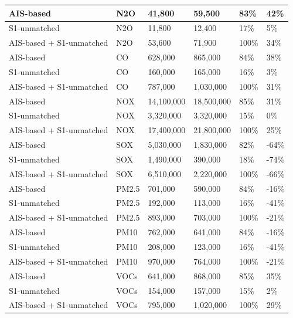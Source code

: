 \documentclass[lineno,pdflatex,sn-nature]{sn-jnl}
\providecommand{\DIFaddbegin}{} %
\providecommand{\DIFaddend}{} %
\providecommand{\DIFaddendFL}{} %
\providecommand{\DIFaddincludegraphics}[2][]{{\color{blue}\fbox{\DIFOincludegraphics[#1]{#2}}}} %
\DeclareRobustCommand{\DIFaddbegin}{\DIFOaddbegin \let\includegraphics\DIFaddincludegraphics} %
\DeclareRobustCommand{\DIFaddend}{\DIFOaddend \let\includegraphics\DIFOincludegraphics} %
\DeclareRobustCommand{\DIFaddendFL}{\DIFOaddendFL \let\includegraphics\DIFOincludegraphics} %
\begin{document}
\begin{table}[!h]
\begin{tabular}[t]{l|l|l|l|l|l}
AIS-based & N2O & 41,800 & 59,500 & 83\% & 42\%\\
\hline
S1-unmatched & N2O & 11,800 & 12,400 & 17\% & 5\%\\
\hline
AIS-based + S1-unmatched & N2O & 53,600 & 71,900 & 100\% & 34\%\\
\hline
AIS-based & CO & 628,000 & 865,000 & 84\% & 38\%\\
\hline
S1-unmatched & CO & 160,000 & 165,000 & 16\% & 3\%\\
\hline
AIS-based + S1-unmatched & CO & 787,000 & 1,030,000 & 100\% & 31\%\\
\hline
AIS-based & NOX & 14,100,000 & 18,500,000 & 85\% & 31\%\\
\hline
S1-unmatched & NOX & 3,320,000 & 3,320,000 & 15\% & 0\%\\
\hline
AIS-based + S1-unmatched & NOX & 17,400,000 & 21,800,000 & 100\% & 25\%\\
\hline
AIS-based & SOX & 5,030,000 & 1,830,000 & 82\% & -64\%\\
\hline
S1-unmatched & SOX & 1,490,000 & 390,000 & 18\% & -74\%\\
\hline
AIS-based + S1-unmatched & SOX & 6,510,000 & 2,220,000 & 100\% & -66\%\\
\hline
AIS-based & PM2.5 & 701,000 & 590,000 & 84\% & -16\%\\
\hline
S1-unmatched & PM2.5 & 192,000 & 113,000 & 16\% & -41\%\\
\hline
AIS-based + S1-unmatched & PM2.5 & 893,000 & 703,000 & 100\% & -21\%\\
\hline
AIS-based & PM10 & 762,000 & 641,000 & 84\% & -16\%\\
\hline
S1-unmatched & PM10 & 208,000 & 123,000 & 16\% & -41\%\\
\hline
AIS-based + S1-unmatched & PM10 & 970,000 & 764,000 & 100\% & -21\%\\
\hline
AIS-based & VOCs & 641,000 & 868,000 & 85\% & 35\%\\
\hline
S1-unmatched & VOCs & 154,000 & 157,000 & 15\% & 2\%\\
\hline
AIS-based + S1-unmatched & VOCs & 795,000 & 1,020,000 & 100\% & 29\%\\
\hline
\end{tabular}
\DIFaddendFL \end{table}
\DIFaddbegin \FloatBarrier
\DIFaddend 
\end{document}
